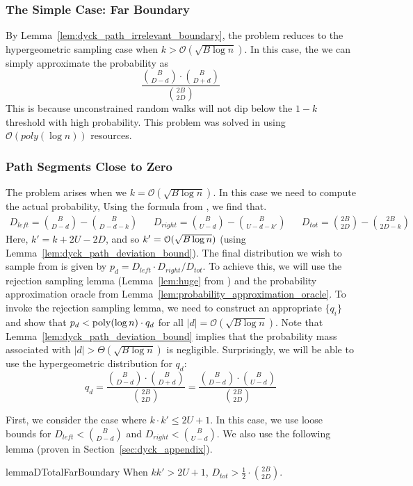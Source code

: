 \subsubsection{The Simple Case: Far Boundary}%
\label{sec:the_simple_case}
By Lemma~\ref{lem:dyck_path_irrelevant_boundary}, the problem reduces to the hypergeometric sampling case when $k>\mathcal{O}(\sqrt{B\log n})$.
In this case, the we can simply approximate the probability as
$$
\frac{{{B}\choose{D-d}}\cdot{{B}\choose{D+d}}}{{{2B}\choose{2D}}}
$$
This is because unconstrained random walks will not dip below the $1-k$ threshold with high probability.
This problem was solved in \cite{huge} using $\mathcal O(poly(\log n))$ resources.

\subsubsection{Path Segments Close to Zero}
The problem arises when we $k = \mathcal{O}(\sqrt{B\log n})$. In this case we need to compute the actual probability,
Using the formula from \cite{trap}, we find that.
{\scriptsize
    \begin{align}
        D_{left} = {{B}\choose{D-d}}-{{B}\choose{D-d-k}}
        &&D_{right} = {{B}\choose{U-d}}-{{B}\choose{U-d-k'}}
        &&D_{tot} = {{2B}\choose{2D}}-{{2B}\choose{2D-k}}
    \end{align}
}
Here, $k' = k+2U-2D$, and so $k' = \Bo(\sqrt{B\log n})$ (using Lemma~\ref{lem:dyck_path_deviation_bound}).
The final distribution we wish to sample from is given by $p_d = D_{left}\cdot D_{right}/D_{tot}$.
To achieve this, we will use the rejection sampling lemma (Lemma~\ref{lem:huge} from \cite{huge})
and the probability approximation oracle from Lemma~\ref{lem:probability_approximation_oracle}.
To invoke the rejection sampling lemma, we need to construct an appropriate $\{q_i\}$
and show that $p_d < \mathrm{poly}(\log n)\cdot q_d$ for all $|d|=\mathcal O(\sqrt{B\log n})$.
Note that Lemma~\ref{lem:dyck_path_deviation_bound} implies that the probability mass associated with $|d|>\Theta(\sqrt{B\log n})$ is negligible.
Surprisingly, we will be able to use the hypergeometric distribution for $q_d$:
$$
q_d = \frac{{B\choose D-d}\cdot{B\choose D+d}}{{2B\choose 2D}} = \frac{{B\choose D-d}\cdot{B\choose U-d}}{{2B\choose 2D}}
$$

First, we consider the case where $k\cdot k'\le 2U+1$.
In this case, we use loose bounds for $D_{left} < \binom{B}{D-d}$ and $D_{right} < \binom{B}{U-d}$.
We also use the following lemma (proven in Section~\ref{sec:dyck_appendix}).
\begin{restatable}{lemma}{DTotalFarBoundary}
\label{lem:DTotalFarBoundary}
When $kk' > 2U + 1$, $D_{tot} > \frac 12\cdot \binom{2B}{2D}$.
\end{restatable}

